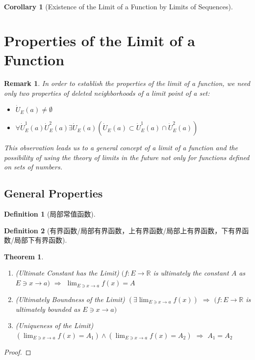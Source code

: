 \documentclass[onecolumn]{ctexart}
\newtheorem{definition}{Definition}
\newtheorem{theorem}{Theorem}
\newtheorem{corollary}{Corollary}
\newtheorem{remark}{Remark}
\begin{document}
\begin{corollary}[Existence of the Limit of a Function by Limits of Sequences]
  
\end{corollary}

\section{Properties of the Limit of a Function}

\begin{remark}
  In order to establish the properties of the limit of a function, we need only 
  two properties of deleted neighborhoods of a limit point of a set:
  \begin{itemize}
    \item $\dot{U}_E(a) \neq \emptyset$
    \item $\forall \dot{U}_E^1(a) \dot{U}_E^2(a) \exists \dot{U}_E(a) 
    (\dot{U}_E(a) \subset \dot{U}_E^1(a) \cap \dot{U}_E^2(a))$
  \end{itemize}
  This observation leads us to a general concept of a limit of a function and 
  the possibility of using the theory of limits in the future not only for 
  functions defined on sets of numbers.
\end{remark}

\subsection{General Properties}

\begin{definition}[局部常值函数]
  
\end{definition}

\begin{definition}[有界函数/局部有界函数，上有界函数/局部上有界函数，下有界函数/局部下有界函数]
  
\end{definition}

\begin{theorem}
  \begin{enumerate}
    \item (Ultimate Constant has the Limit) $(f:E \to \mathbb{R}$ is ultimately the constant $A$ as $E 
    \owns x \to a)$ $\Rightarrow$ $\lim_{E \owns x \to a} f(x) = A$
    \item (Ultimately Boundness of the Limit) $(\exists \lim_{E \owns x \to a} f(x))$ $\Rightarrow$ $(f: E \to \mathbb{R}$ is ultimately bounded as $E \owns x \to a)$
    \item (Uniqueness of the Limit) $(\lim_{E \owns x \to a} f(x) = A_1) \wedge (\lim_{E \owns x \to a} f(x) = A_2)$ $\Rightarrow$ $A_1 = A_2$
  \end{enumerate}
\end{theorem}
\begin{proof}
  
\end{proof}
\end{document}
